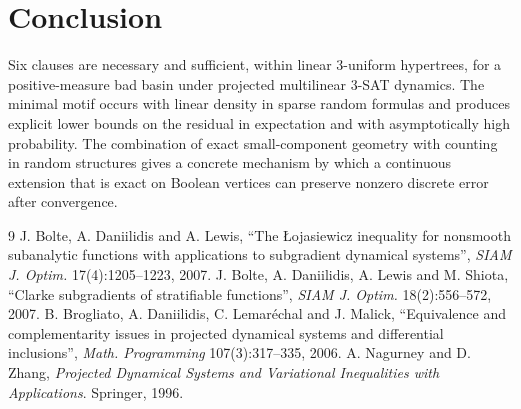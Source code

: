 \documentclass[11pt,a4paper]{article}
\begin{document}
\section{Conclusion}
Six clauses are necessary and sufficient, within linear 3-uniform hypertrees, for a positive-measure bad basin under projected multilinear 3-SAT dynamics. The minimal motif occurs with linear density in sparse random formulas and produces explicit lower bounds on the residual in expectation and with asymptotically high probability. The combination of exact small-component geometry with counting in random structures gives a concrete mechanism by which a continuous extension that is exact on Boolean vertices can preserve nonzero discrete error after convergence.

\begin{thebibliography}{9}
 J. Bolte, A. Daniilidis and A. Lewis, ``The \L{}ojasiewicz inequality for nonsmooth subanalytic functions with applications to subgradient dynamical systems'', \emph{SIAM J. Optim.} 17(4):1205--1223, 2007.
 J. Bolte, A. Daniilidis, A. Lewis and M. Shiota, ``Clarke subgradients of stratifiable functions'', \emph{SIAM J. Optim.} 18(2):556--572, 2007.
 B. Brogliato, A. Daniilidis, C. Lemar\'echal and J. Malick, ``Equivalence and complementarity issues in projected dynamical systems and differential inclusions'', \emph{Math. Programming} 107(3):317--335, 2006.
 A. Nagurney and D. Zhang, \emph{Projected Dynamical Systems and Variational Inequalities with Applications}. Springer, 1996.
\end{thebibliography}
\end{document}
